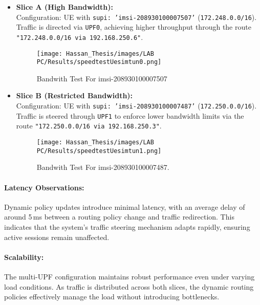 \begin{itemize}
    \item \textbf{Slice A (High Bandwidth):}\\
    Configuration: UE with \texttt{supi: 'imsi-208930100007507'} 
    (\texttt{172.248.0.0/16}). Traffic is directed via \texttt{UPF0}, achieving 
    higher throughput through the route 
    \texttt{"172.248.0.0/16 via 192.168.250.6"}.

\begin{figure}[H]
        \centering
     
 \texttt{[image: Hassan\_Thesis/images/LAB PC/Results/speedtestUesimtun0.png]}
        \caption{Bandwith Test For imsi-208930100007507}
        \label{fig:bandwidth-test-slice-A}
    \end{figure}

    \item \textbf{Slice B (Restricted Bandwidth):}\\
    Configuration: UE with \texttt{supi: 'imsi-208930100007487'} 
    (\texttt{172.250.0.0/16}). Traffic is steered through \texttt{UPF1} to 
    enforce lower bandwidth limits via the route 
    \texttt{"172.250.0.0/16 via 192.168.250.3"}.

\begin{figure}[H]
        \centering
 \texttt{[image: Hassan\_Thesis/images/LAB PC/Results/speedtestUesimtun1.png]}
        \caption{Bandwith Test For imsi-208930100007487.}
        \label{fig:bandwith-test-slice-B}
    \end{figure}
    
\end{itemize}

\noindent

\paragraph{Latency Observations:}
Dynamic policy updates introduce minimal latency, with an average delay of 
around 5\,ms between a routing policy change and traffic redirection. This 
indicates that the system’s traffic steering mechanism adapts rapidly, 
ensuring active sessions remain unaffected.

\paragraph{Scalability:}
The multi-UPF configuration maintains robust performance even under varying 
load conditions. As traffic is distributed across both slices, the dynamic 
routing policies effectively manage the load without introducing bottlenecks.


